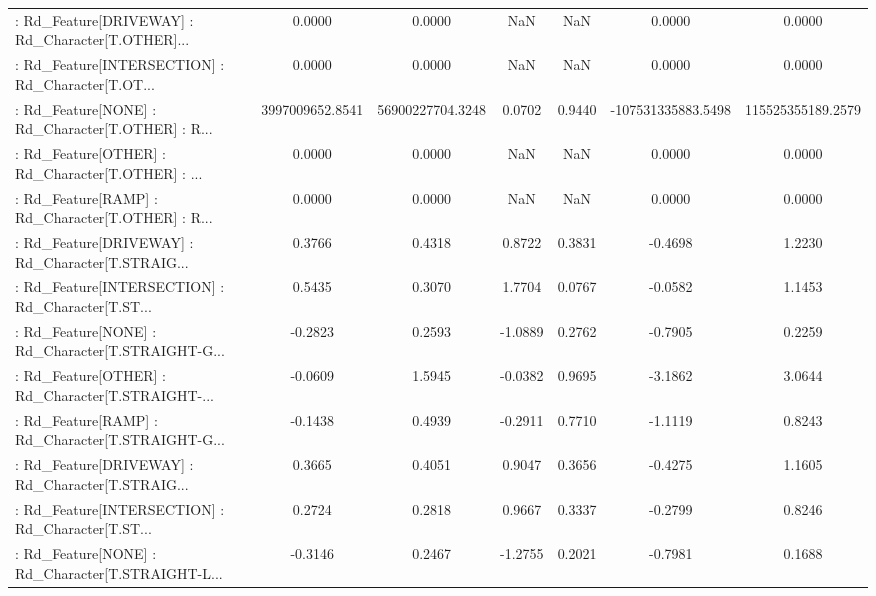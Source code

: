 \begin{longtable}{p{4cm}cccccc}
 : Rd\_Feature[DRIVEWAY] : Rd\_Character[T.OTHER]... &            0.0000 &            0.0000 &     NaN &          NaN &             0.0000 &            0.0000 \\
 : Rd\_Feature[INTERSECTION] : Rd\_Character[T.OT... &            0.0000 &            0.0000 &     NaN &          NaN &             0.0000 &            0.0000 \\
 : Rd\_Feature[NONE] : Rd\_Character[T.OTHER] : R... &   3997009652.8541 &  56900227704.3248 &  0.0702 &       0.9440 & -107531335883.5498 & 115525355189.2579 \\
 : Rd\_Feature[OTHER] : Rd\_Character[T.OTHER] : ... &            0.0000 &            0.0000 &     NaN &          NaN &             0.0000 &            0.0000 \\
 : Rd\_Feature[RAMP] : Rd\_Character[T.OTHER] : R... &            0.0000 &            0.0000 &     NaN &          NaN &             0.0000 &            0.0000 \\
 : Rd\_Feature[DRIVEWAY] : Rd\_Character[T.STRAIG... &            0.3766 &            0.4318 &  0.8722 &       0.3831 &            -0.4698 &            1.2230 \\
 : Rd\_Feature[INTERSECTION] : Rd\_Character[T.ST... &            0.5435 &            0.3070 &  1.7704 &       0.0767 &            -0.0582 &            1.1453 \\
 : Rd\_Feature[NONE] : Rd\_Character[T.STRAIGHT-G... &           -0.2823 &            0.2593 & -1.0889 &       0.2762 &            -0.7905 &            0.2259 \\
 : Rd\_Feature[OTHER] : Rd\_Character[T.STRAIGHT-... &           -0.0609 &            1.5945 & -0.0382 &       0.9695 &            -3.1862 &            3.0644 \\
 : Rd\_Feature[RAMP] : Rd\_Character[T.STRAIGHT-G... &           -0.1438 &            0.4939 & -0.2911 &       0.7710 &            -1.1119 &            0.8243 \\
 : Rd\_Feature[DRIVEWAY] : Rd\_Character[T.STRAIG... &            0.3665 &            0.4051 &  0.9047 &       0.3656 &            -0.4275 &            1.1605 \\
 : Rd\_Feature[INTERSECTION] : Rd\_Character[T.ST... &            0.2724 &            0.2818 &  0.9667 &       0.3337 &            -0.2799 &            0.8246 \\
 : Rd\_Feature[NONE] : Rd\_Character[T.STRAIGHT-L... &           -0.3146 &            0.2467 & -1.2755 &       0.2021 &            -0.7981 &            0.1688 \\

\end{longtable}
